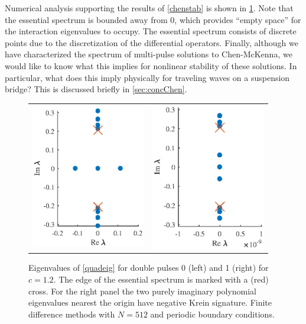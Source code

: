 \documentclass[thesis.tex]{subfiles}
\begin{document}
Numerical analysis supporting the results of \cref{chenstab} is shown in \cref{fig:quadeigdouble}. Note that the essential spectrum is bounded away from 0, which provides ``empty space'' for the interaction eigenvalues to occupy. The essential spectrum consists of discrete points due to the discretization of the differential operators. Finally, although we have characterized the spectrum of multi-pulse solutions to Chen-McKenna, we would like to know what this implies for nonlinear stability of these solutions. In particular, what does this imply physically for traveling waves on a suspension bridge? This is discussed briefly in \cref{sec:concChen}.
\begin{figure}
\centering
\begin{tabular}{cc}
\includegraphics[width=5cm]{images/other/spec12_double1}&
\includegraphics[width=5cm]{images/other/spec12_double2}
\end{tabular} 
\caption[Eigenvalues for double pulses in Chen-McKenna]{Eigenvalues of \cref{quadeig} for double pulses 0 (left) and 1 (right) for $c=1.2$. The edge of the essential spectrum is marked with a (red) cross. For the right panel the two purely imaginary polynomial eigenvalues nearest the origin have negative Krein signature. Finite difference methods with $N = 512$ and periodic boundary conditions.}
\label{fig:quadeigdouble}
\end{figure}
\end{document}
